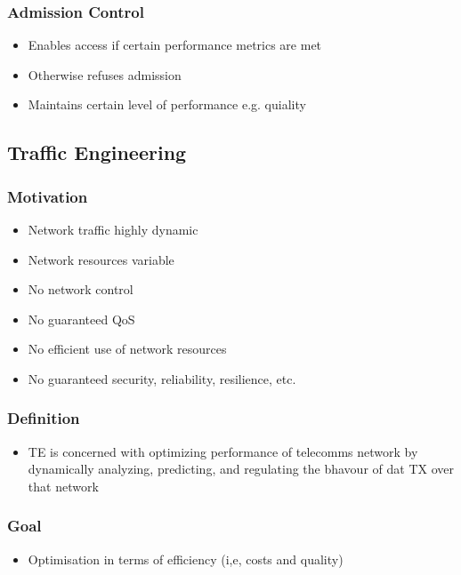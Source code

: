 \documentclass[a4paper]{article}
\begin{document}
\subsubsection{Admission Control}
\begin{itemize}
	\item Enables access if certain performance metrics are met
	\item Otherwise refuses admission
	\item Maintains certain level of performance e.g. quiality
\end{itemize}
\subsection{Traffic Engineering}
\subsubsection{Motivation}
\begin{itemize}
	\item Network traffic highly dynamic
	\item Network resources variable
	\item No network control
	\item No guaranteed QoS
	\item No efficient use of network resources
	\item No guaranteed security, reliability, resilience, etc.
\end{itemize}
\subsubsection{Definition}
\begin{itemize}
	\item TE is concerned with optimizing performance of telecomms network
		by dynamically analyzing, predicting, and regulating the bhavour
		of dat TX over that network
\end{itemize}
\subsubsection{Goal}
\begin{itemize}
	\item Optimisation in terms of efficiency (i,e, costs and quality)
\end{itemize}
\end{document}
